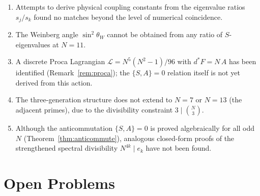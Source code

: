 \documentclass[aip,jmp,reprint,superscriptaddress,floatfix,nofootinbib]{revtex4-2}
\theoremstyle{definition}
\theoremstyle{remark}
\begin{document}
\begin{enumerate}
\item Attempts to derive physical coupling constants from the
      eigenvalue ratios $s_j/s_k$ found no matches beyond the level
      of numerical coincidence.

\item The Weinberg angle $\sin^2\theta_W$ cannot be obtained from
      any ratio of $S$-eigenvalues at $N{=}11$.

\item A discrete Proca Lagrangian $\mathcal{L}=N^5(N^2{-}1)/96$ with $d^*F=N\,A$
      has been identified (Remark~\ref{rem:proca}); the $\{S,A\}=0$
      relation itself is not yet derived from this action.

\item The three-generation structure does not extend to $N{=}7$
      or $N{=}13$ (the adjacent primes), due to the divisibility
      constraint $3 \mid \binom{N}{3}$.

\item Although the anticommutation $\{S,A\}=0$ is proved algebraically
      for all odd~$N$ (Theorem~\ref{thm:anticommute}), analogous
      closed-form proofs of the strengthened spectral divisibility
      $N^{4k}\mid e_k$ have not been found.
\end{enumerate}

\section{Open Problems}
\label{sec:limitations}
\end{document}
